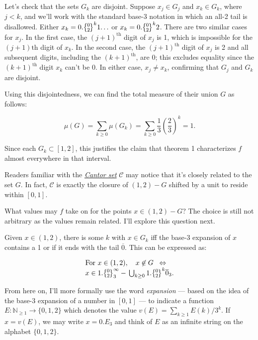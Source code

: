 \documentclass[20pt,]{extarticle}
\begin{document}
Let's check that the sets \(G_k\) are disjoint. Suppose \(x_j\in G_j\)
and \(x_k\in G_k\), where \(j < k\), and we'll work with the standard
base-3 notation in which an all-2 tail is disallowed. Either
\(x_k=0.\zerotwo^k1\!\ldots\) or \(x_k=0.\zerotwo^k2\). There are two
similar cases for \(x_j\). In the first case, the \((j+1)^\text{th}\)
digit of \(x_j\) is 1, which is impossible for the \((j+1)\text{th}\)
digit of \(x_k\). In the second case, the \((j+1)^\text{th}\) digit of
\(x_j\) is 2 and all subsequent digits, including the
\((k+1)^\text{th}\), are 0; this excludes equality since the
\((k+1)^\text{th}\) digit \(x_k\) can't be 0. In either case,
\(x_j\ne x_k\), confirming that \(G_j\) and \(G_k\) are disjoint.

Using this disjointedness, we can find the total measure of their union
\(G\) as follows:

\[\mu(G) = \sum_{k \ge 0}\mu(G_k) = \sum_{k\ge 0}
\frac{1}{3}\left(\frac{2}{3}\right)^k = 1.\]

Since each \(G_k\subset [1,2]\), this justifies the claim that theorem 1
characterizes \(f\) almost everywhere in that interval.

\newcommand{\cantor}{\mathcal{C}}

Readers familiar with the
\href{https://en.wikipedia.org/wiki/Cantor_set}{\emph{Cantor set}}
\(\cantor\) may notice that it's closely related to the set \(G\). In
fact, \(\cantor\) is exactly the closure of \((1,2)-G\) shifted by a
unit to reside within \([0,1].\)

What values may \(f\) take on for the points \(x\in (1,2) - G\)? The
choice is still not arbitrary as the values remain related. I'll explore
this question next.

Given \(x\in (1,2)\), there is some \(k\) with \(x\in G_k\) iff the
base-3 expansion of \(x\) contains a 1 or if it ends with the tail
\(\overline{0}\). This can be expressed as:

\begin{equation}\begin{array}{l}
\text{For } x\in (1,2),\quad
  x\not\in G \;\;\Leftrightarrow\;\; \\
  x \in 1.\zerotwo^\infty_3 -\,
  \bigcup_{k\ge 0} 1.\zerotwo^k\overline{0}_3.
\end{array}\label{eq:onetwo_lessG}\end{equation}

From here on, I'll more formally use the word \emph{expansion} --- based
on the idea of the base-3 expansion of a number in \([0,1]\) --- to
indicate a function \(E:\mathbb{N}_{\ge 1}\to \{0, 1, 2\}\) which
denotes the value \(v(E) = \sum_{k\ge 1}E(k)/3^k.\) If \(x=v(E)\), we
may write \(x = 0.E_3\) and think of \(E\) as an infinite string on the
alphabet \(\{0,1,2\}\).
\end{document}
